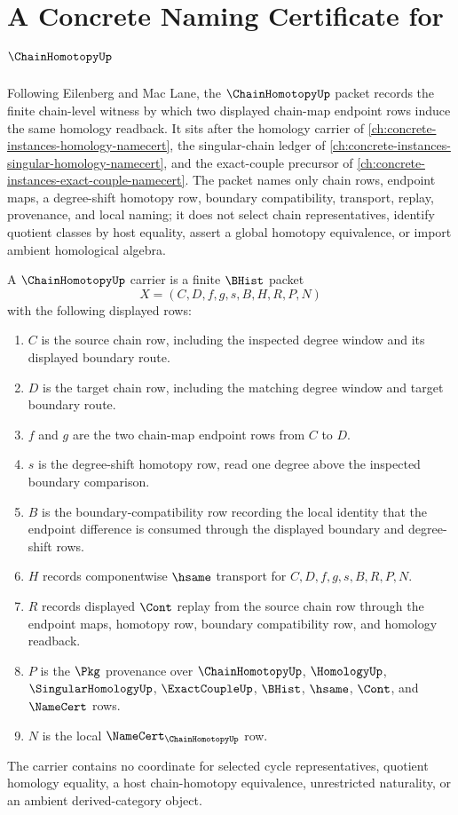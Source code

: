 \chapter{A Concrete Naming Certificate for $\ChainHomotopyUp$}
\label{ch:concrete-instances-chain-homotopy-namecert}

Following Eilenberg and Mac Lane, the $\ChainHomotopyUp$ packet records the finite chain-level witness by which two displayed chain-map endpoint rows induce the same homology readback. It sits after the homology carrier of \autoref{ch:concrete-instances-homology-namecert}, the singular-chain ledger of \autoref{ch:concrete-instances-singular-homology-namecert}, and the exact-couple precursor of \autoref{ch:concrete-instances-exact-couple-namecert}. The packet names only chain rows, endpoint maps, a degree-shift homotopy row, boundary compatibility, transport, replay, provenance, and local naming; it does not select chain representatives, identify quotient classes by host equality, assert a global homotopy equivalence, or import ambient homological algebra.

\begin{definition}
\label{def:chain-homotopy-carrier}
A $\ChainHomotopyUp$ carrier is a finite $\BHist$ packet
$$
X=(C,D,f,g,s,B,H,R,P,N)
$$
with the following displayed rows:
\begin{enumerate}
\item $C$ is the source chain row, including the inspected degree window and its displayed boundary route.
\item $D$ is the target chain row, including the matching degree window and target boundary route.
\item $f$ and $g$ are the two chain-map endpoint rows from $C$ to $D$.
\item $s$ is the degree-shift homotopy row, read one degree above the inspected boundary comparison.
\item $B$ is the boundary-compatibility row recording the local identity that the endpoint difference is consumed through the displayed boundary and degree-shift rows.
\item $H$ records componentwise $\hsame$ transport for $C,D,f,g,s,B,R,P,N$.
\item $R$ records displayed $\Cont$ replay from the source chain row through the endpoint maps, homotopy row, boundary compatibility row, and homology readback.
\item $P$ is the $\Pkg$ provenance over $\ChainHomotopyUp$, $\HomologyUp$, $\SingularHomologyUp$, $\ExactCoupleUp$, $\BHist$, $\hsame$, $\Cont$, and $\NameCert$ rows.
\item $N$ is the local $\NameCert_{\ChainHomotopyUp}$ row.
\end{enumerate}
The carrier contains no coordinate for selected cycle representatives, quotient homology equality, a host chain-homotopy equivalence, unrestricted naturality, or an ambient derived-category object.
\end{definition}

